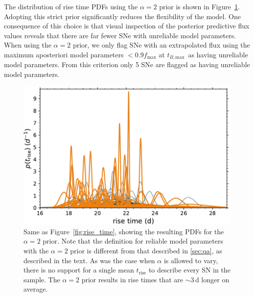 \documentclass[twocolumn]{./aastex63}
\newcommand{\tbmax}{$t_{B,\mathrm{max}}$}
\begin{document}
The distribution of rise time PDFs using the $\alpha = 2$ prior is shown in
Figure~\ref{fig:tsquared_rise}. Adopting this strict prior significantly reduces
the flexibility of the model. One consequence of this choice is that visual
inspection of the posterior predictive flux values reveals that there are far
fewer SNe with unreliable model parameters. When using the $\alpha = 2$ prior,
we only flag SNe with an extrapolated flux using the maximum aposteriori model
parameters $< 0.9 f_\mathrm{max}$ at \tbmax\ as having unreliable model
parameters. From this criterion only 5 SNe are flagged as having unreliable
model parameters.

\begin{figure}
    \centering
    \includegraphics[width=1\linewidth]{./figures/tsquared_rise_time.pdf}
    \caption{Same as Figure~\ref{fig:rise_time}, showing the resulting PDFs for
    the $\alpha = 2$ prior. Note that the definition for reliable model
    parameters with the $\alpha = 2$ prior is different from that described in
    \ref{sec:qa}, as described in the text. As was the case when $\alpha$ is
    allowed to vary, there is no support for a single mean $t_\mathrm{rise}$ to
    describe every SN in the sample. The $\alpha = 2$ prior results in rise
    times that are $\sim$3\,d longer on average.}
    \label{fig:tsquared_rise}
\end{figure}
\end{document}
